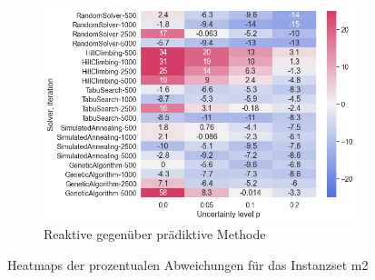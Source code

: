 \begin{figure}[H]
\begin{subfigure}{1\linewidth}
        \centering
        \includegraphics[width=0.5\linewidth]{assets/img/05_Evaluation/heatmap_m2_3.png}
        \caption{Reaktive gegenüber prädiktive Methode}
        \label{fig:evaluation_solver_m2_heatmap_3}
    \end{subfigure}
    
    \caption{Heatmaps der prozentualen Abweichungen für das Instanzset m2}
    \label{fig:evaluation_m2_heatmaps}
\end{figure}


